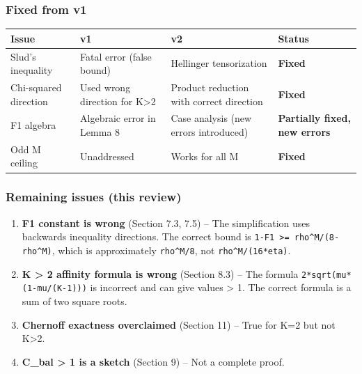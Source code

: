 \documentclass[
  12pt,
]{ctexart}
\begin{document}
\subsubsection{Fixed from v1}\label{fixed-from-v1}

\begin{longtable}[]{@{}
  >{\raggedright\arraybackslash}p{}
  >{\raggedright\arraybackslash}p{}
  >{\raggedright\arraybackslash}p{}
  >{\raggedright\arraybackslash}p{}@{}}
\toprule\noalign{}
\begin{minipage}[b]{\linewidth}\raggedright
Issue
\end{minipage} & \begin{minipage}[b]{\linewidth}\raggedright
v1
\end{minipage} & \begin{minipage}[b]{\linewidth}\raggedright
v2
\end{minipage} & \begin{minipage}[b]{\linewidth}\raggedright
Status
\end{minipage} \\
\midrule\noalign{}
\endhead
\bottomrule\noalign{}
\endlastfoot
Slud's inequality & Fatal error (false bound) & Hellinger tensorization
& \textbf{Fixed} \\
Chi-squared direction & Used wrong direction for K\textgreater2 &
Product reduction with correct direction & \textbf{Fixed} \\
F1 algebra & Algebraic error in Lemma 8 & Case analysis (new errors
introduced) & \textbf{Partially fixed, new errors} \\
Odd M ceiling & Unaddressed & Works for all M & \textbf{Fixed} \\
\end{longtable}

\subsubsection{Remaining issues (this
review)}\label{remaining-issues-this-review}

\begin{enumerate}
\def\labelenumi{\arabic{enumi}.}
\item
  \textbf{F1 constant is wrong} (Section 7.3, 7.5) -- The simplification
  uses backwards inequality directions. The correct bound is
  \texttt{1-F1\ \textgreater{}=\ rho\^{}M/(8-rho\^{}M)}, which is
  approximately \texttt{rho\^{}M/8}, not \texttt{rho\^{}M/(16*eta)}.
\item
  \textbf{K \textgreater{} 2 affinity formula is wrong} (Section 8.3) --
  The formula \texttt{2*sqrt(mu*(1-mu/(K-1)))} is incorrect and can give
  values \textgreater{} 1. The correct formula is a sum of two square
  roots.
\item
  \textbf{Chernoff exactness overclaimed} (Section 11) -- True for K=2
  but not K\textgreater2.
\item
  \textbf{C\_bal \textgreater{} 1 is a sketch} (Section 9) -- Not a
  complete proof.
\end{enumerate}
\end{document}
